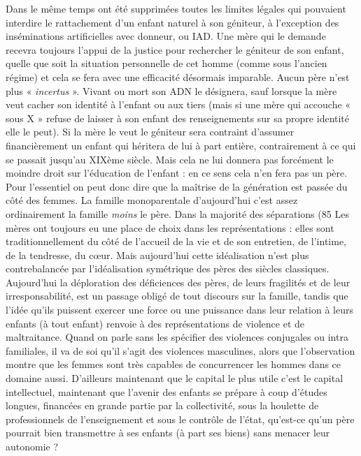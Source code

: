  Dans le même temps ont été supprimées toutes les limites légales qui pouvaient interdire le rattachement d'un enfant naturel à son géniteur, à l'exception des inséminations artificielles avec donneur, ou IAD. Une mère qui le demande recevra toujours l'appui de la justice pour rechercher le géniteur de son enfant, quelle que soit la situation personnelle de cet homme (comme sous l'ancien régime) et cela se fera avec une efficacité désormais imparable. Aucun père n'est plus « \emph{incertus} ». Vivant ou mort son ADN le désignera, sauf lorsque la mère veut cacher son identité à l'enfant ou aux tiers (mais si une mère qui accouche « sous X » refuse de laisser à son enfant des renseignements sur sa propre identité elle le peut). Si la mère le veut le géniteur sera contraint d'assumer financièrement un enfant qui héritera de lui à part entière, contrairement à ce qui se passait jusqu'au XIXème siècle. Mais cela ne lui donnera pas forcément le moindre droit sur l'éducation de l'enfant : en ce sens cela n'en fera pas un père.
 Pour l'essentiel on peut donc dire que la maîtrise de la génération est passée du côté des femmes. La famille monoparentale d'aujourd'hui c'est assez ordinairement la famille \emph{moins} le père. Dans la majorité des séparations (85 %
 Les mères ont toujours eu une place de choix dans les représentations : elles sont traditionnellement du côté de l'accueil de la vie et de son entretien, de l'intime, de la tendresse, du cœur. Mais aujourd'hui cette idéalisation n'est plus contrebalancée par l'idéalisation symétrique des pères des siècles classiques. Aujourd'hui la déploration des déficiences des pères, de leurs fragilités et de leur irresponsabilité, est un passage obligé de tout discours sur la famille, tandis que l'idée qu'ils puissent exercer une force ou une puissance dans leur relation à leurs enfants (à tout enfant) renvoie à des représentations de violence et de maltraitance. Quand on parle sans les spécifier des violences conjugales ou intra familiales, il va de soi qu'il s'agit des violences masculines, alors que l'observation montre que les femmes sont très capables de concurrencer les hommes dans ce domaine aussi. 
 D'ailleurs maintenant que le capital le plus utile c'est le capital intellectuel, maintenant que l'avenir des enfants se prépare à coup d'études longues, financées en grande partie par la collectivité, sous la houlette de professionnels de l'enseignement et sous le contrôle de l'état, qu'est-ce qu'un père pourrait bien transmettre à ses enfants (à part ses biens) sans menacer leur autonomie ?
